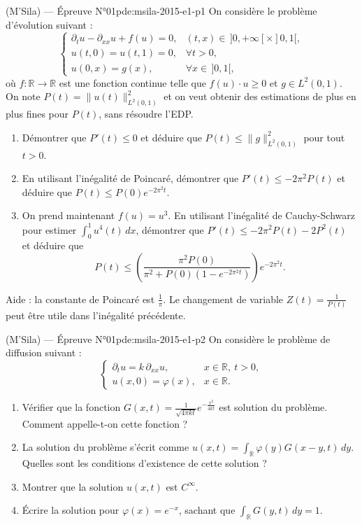 \begin{problem}{(M'Sila) — Épreuve N°01}{pde:msila-2015-e1-p1}
On considère le problème d'évolution suivant :
$$\begin{cases}\partial_tu-\partial_{xx}u+f(u)=0, & (t,x)\in\,]0,+\infty[\times]0,1[,\\ u(t,0)=u(t,1)=0, & \forall t>0,\\ u(0,x)=g(x), & \forall x\in\,]0,1[,\end{cases}$$
où $f:\mathbb{R}\to\mathbb{R}$ est une fonction continue telle que $f(u)\cdot u\geq0$ et $g\in L^2(0,1)$. On note $P(t)=\lVert u(t)\rVert_{L^2(0,1)}^2$ et on veut obtenir des estimations de plus en plus fines pour $P(t)$, sans résoudre l'EDP.
\begin{enumerate}\item Démontrer que $P'(t)\leq0$ et déduire que $P(t)\leq\lVert g\rVert_{L^2(0,1)}^2$ pour tout $t>0$.\item En utilisant l'inégalité de Poincaré, démontrer que $P'(t)\leq-2\pi^2P(t)$ et déduire que $P(t)\leq P(0)e^{-2\pi^2t}$.\item On prend maintenant $f(u)=u^3$. En utilisant l'inégalité de Cauchy-Schwarz pour estimer $\int_0^1u^4(t)\,dx$, démontrer que $P'(t)\leq-2\pi^2P(t)-2P^2(t)$ et déduire que
$$P(t)\leq\left(\frac{\pi^2P(0)}{\pi^2+P(0)\left(1-e^{-2\pi^2t}\right)}\right)e^{-2\pi^2t}.$$\end{enumerate}
Aide : la constante de Poincaré est $\frac1\pi$. Le changement de variable $Z(t)=\frac1{P(t)}$ peut être utile dans l'inégalité précédente.
\end{problem}
\newpage
\begin{problem}{(M'Sila) — Épreuve N°01}{pde:msila-2015-e1-p2}
On considère le problème de diffusion suivant :
$$\begin{cases}\partial_tu=k\,\partial_{xx}u, & x\in\mathbb{R},\ t>0,\\ u(x,0)=\varphi(x), & x\in\mathbb{R}.\end{cases}$$
\begin{enumerate}\item Vérifier que la fonction $G(x,t)=\frac{1}{\sqrt{4\pi kt}}e^{-\frac{x^2}{4kt}}$ est solution du problème. Comment appelle-t-on cette fonction ?\item La solution du problème s'écrit comme $u(x,t)=\int_{\mathbb{R}}\varphi(y)G(x-y,t)\,dy$. Quelles sont les conditions d'existence de cette solution ?\item Montrer que la solution $u(x,t)$ est $C^\infty$.\item Écrire la solution pour $\varphi(x)=e^{-x}$, sachant que $\int_{\mathbb{R}}G(y,t)\,dy=1$.\end{enumerate}
\end{problem}
